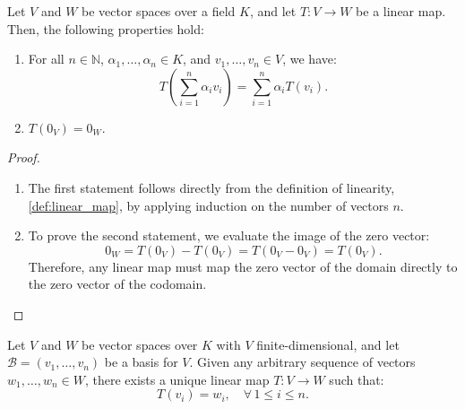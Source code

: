 \begin{proposition}
\label{prop:properties_linear_maps}
Let $V$ and $W$ be vector spaces over a field $K$, and let $T: V \to W$ be a linear map. Then, the following properties hold:
\begin{enumerate}
    \item For all $n \in \mathbb{N}$, $\alpha_1, \dots, \alpha_n \in K$, and $v_1, \dots, v_n \in V$, we have:
    \[
    T\left( \sum_{i=1}^n \alpha_i v_i \right) = \sum_{i=1}^n \alpha_i T(v_i).
    \]
    \item $T(0_V) = 0_W$.
\end{enumerate}
\end{proposition}

\begin{proof}
\begin{enumerate}
    \item The first statement follows directly from the definition of linearity, \cref{def:linear_map}, by applying induction on the number of vectors $n$.
    \item To prove the second statement, we evaluate the image of the zero vector:
    \[
    0_W = T(0_V) - T(0_V) = T(0_V - 0_V) = T(0_V).
    \]
    Therefore, any linear map must map the zero vector of the domain directly to the zero vector of the codomain.
\end{enumerate}
\end{proof}

\begin{theorem}
\label{thm:existence_uniqueness_linear_map}
Let $V$ and $W$ be vector spaces over $K$ with $V$ finite-dimensional, and let $\mathcal{B} = (v_1, \dots, v_n)$ be a basis for $V$. Given any arbitrary sequence of vectors $w_1, \dots, w_n \in W$, there exists a unique linear map $T: V \to W$ such that:
\[
T(v_i) = w_i, \quad \forall \, 1 \le i \le n.
\]
\end{theorem}

